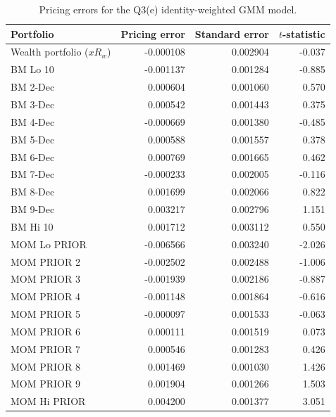 \begin{table}[htbp]
\centering
\small
\caption{Pricing errors for the Q3(e) identity-weighted GMM model.}
\label{tab:q3e-pricing-errors}
\begin{tabular}{lrrr}
\hline
Portfolio & Pricing error & Standard error & $t$-statistic \\
\hline
Wealth portfolio ($xR_w$) & -0.000108 & 0.002904 & -0.037 \\
BM Lo 10 & -0.001137 & 0.001284 & -0.885 \\
BM 2-Dec & 0.000604 & 0.001060 & 0.570 \\
BM 3-Dec & 0.000542 & 0.001443 & 0.375 \\
BM 4-Dec & -0.000669 & 0.001380 & -0.485 \\
BM 5-Dec & 0.000588 & 0.001557 & 0.378 \\
BM 6-Dec & 0.000769 & 0.001665 & 0.462 \\
BM 7-Dec & -0.000233 & 0.002005 & -0.116 \\
BM 8-Dec & 0.001699 & 0.002066 & 0.822 \\
BM 9-Dec & 0.003217 & 0.002796 & 1.151 \\
BM Hi 10 & 0.001712 & 0.003112 & 0.550 \\
MOM Lo PRIOR & -0.006566 & 0.003240 & -2.026 \\
MOM PRIOR 2 & -0.002502 & 0.002488 & -1.006 \\
MOM PRIOR 3 & -0.001939 & 0.002186 & -0.887 \\
MOM PRIOR 4 & -0.001148 & 0.001864 & -0.616 \\
MOM PRIOR 5 & -0.000097 & 0.001533 & -0.063 \\
MOM PRIOR 6 & 0.000111 & 0.001519 & 0.073 \\
MOM PRIOR 7 & 0.000546 & 0.001283 & 0.426 \\
MOM PRIOR 8 & 0.001469 & 0.001030 & 1.426 \\
MOM PRIOR 9 & 0.001904 & 0.001266 & 1.503 \\
MOM Hi PRIOR & 0.004200 & 0.001377 & 3.051 \\
\hline
\end{tabular}
\end{table}
